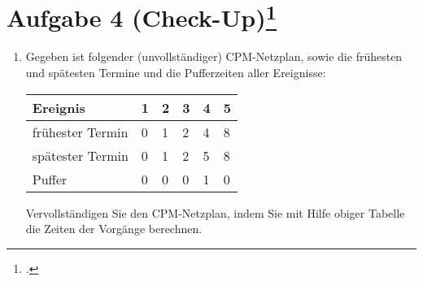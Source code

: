 \documentclass{lehramt-informatik-aufgabe}
\begin{document}
\section{Aufgabe 4 (Check-Up)\footcite[Seite 2]{sosy:ab:5}}

\begin{enumerate}


\item Gegeben ist folgender (unvollständiger) CPM-Netzplan, sowie die
frühesten und spätesten Termine und die Pufferzeiten aller Ereignisse:

\begin{minipage}{4cm}
\end{minipage}
%
\begin{minipage}{5cm}
\begin{tabular}{|l|l|l|l|l|l|}
\hline
Ereignis         & 1 & 2 & 3 & 4 & 5 \\\hline\hline
frühester Termin & 0 & 1 & 2 & 4 & 8 \\\hline
spätester Termin & 0 & 1 & 2 & 5 & 8 \\\hline
Puffer           & 0 & 0 & 0 & 1 & 0 \\\hline
\end{tabular}
\end{minipage}

Vervollständigen Sie den CPM-Netzplan, indem Sie mit Hilfe obiger
Tabelle die Zeiten der Vorgänge berechnen.

\begin{antwort}

%



\end{antwort}
\end{enumerate}
\end{document}
